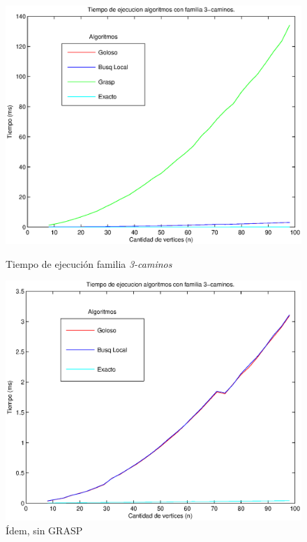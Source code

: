 \begin{figure}[H]
    \begin{minipage}{0.5\linewidth}
      \includegraphics[width=\linewidth]{graficos/todos_tiempo_3caminos.eps}
      \caption{Tiempo de ejecución familia \emph{3-caminos}}\label{fig:3caminos-all}
    \end{minipage}
    \hfill
    \begin{minipage}{0.5\linewidth} 
      \includegraphics[width=\linewidth]{graficos/todos_tiempo_3caminos_sinG.eps}
      \caption{Ídem, sin GRASP}\label{fig:3caminos-sinG}
    \end{minipage}    
\end{figure}

